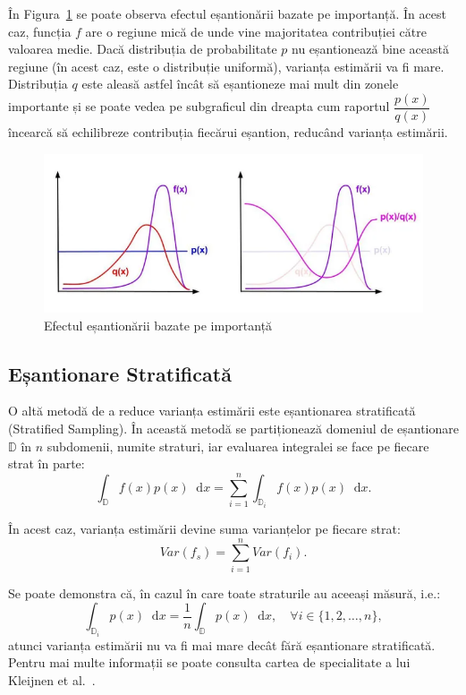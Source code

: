\documentclass[12pt,a4paper]{report}
\newcommand*\diff{\mathop{}\!\mathrm{d}}
\numberwithin{equation}{section} %
\begin{document}
În Figura~\ref{fig:is} se poate observa efectul eșantionării bazate pe importanță.
În acest caz, funcția $f$ are o regiune mică de unde vine majoritatea contribuției
către valoarea medie. Dacă distribuția de probabilitate $p$ nu eșantionează bine
această regiune (în acest caz, este o distribuție uniformă), varianța estimării
va fi mare. Distribuția $q$ este aleasă astfel încât să eșantioneze mai mult din
zonele importante și se poate vedea pe subgraficul din dreapta cum raportul
$\dfrac{p(x)}{q(x)}$ încearcă să echilibreze contribuția fiecărui eșantion, reducând
varianța estimării.

\begin{figure}[th]
	\centering
	\includegraphics[width=\textwidth]{pics/is.png}
	\caption{Efectul eșantionării bazate pe importanță\protect\footnotemark}
	\label{fig:is}
\end{figure}

\subsection{Eșantionare Stratificată}\label{sec:stratified}

O altă metodă de a reduce varianța estimării este eșantionarea stratificată (Stratified Sampling).
În această metodă se partiționează domeniul de eșantionare $\mathbb{D}$ în $n$ subdomenii,
numite straturi, iar evaluarea integralei se face pe fiecare strat în parte:
\begin{equation}
	\int_{\mathbb{D}} f(x) p(x)\diff x = \sum_{i=1}^{n} \int_{\mathbb{D}_i} f(x) p(x)\diff x.
\end{equation}

În acest caz, varianța estimării devine suma varianțelor pe fiecare strat:
\begin{equation}
	Var(f_s) = \sum_{i=1}^{n} Var(f_i).
\end{equation}

Se poate demonstra că, în cazul în care toate straturile au aceeași măsură, i.e.:
\begin{equation}
	\int_{\mathbb{D}_i} p(x)\diff x = \frac{1}{n}\int_{\mathbb{D}} p(x)\diff x, \quad \forall i \in \{1, 2, \ldots, n\},
\end{equation}
atunci varianța estimării nu va fi mai mare decât fără eșantionare stratificată.
Pentru mai multe informații se poate consulta cartea de specialitate a lui Kleijnen et al.~\cite{Kleijnen2013}.
\end{document}
